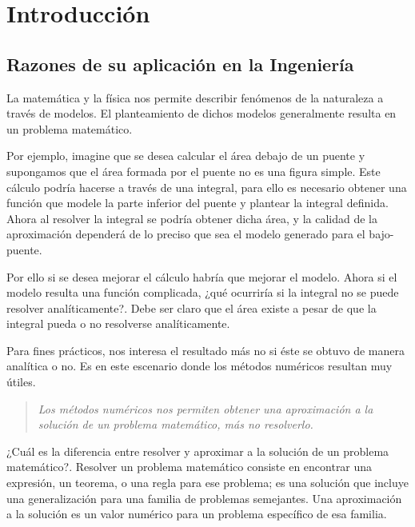 \chapter{Introducción}


\section{Razones de su aplicación en la Ingeniería}
La matemática y la física nos permite describir fenómenos de la naturaleza a través de modelos. El planteamiento de dichos modelos
generalmente resulta en un problema matemático. 

Por ejemplo, imagine que se desea calcular el área debajo de un puente y supongamos que el área formada por el puente no es una figura simple. 
Este cálculo podría hacerse a través de una integral, para ello es necesario obtener una función que modele la parte inferior del puente y plantear
la integral definida. Ahora al resolver la integral se podría obtener dicha área, y la calidad de la aproximación dependerá de lo preciso que sea
el modelo generado para el bajo-puente.

Por ello si se desea mejorar el cálculo habría que mejorar el modelo. Ahora si el modelo resulta una función complicada, ¿qué ocurriría si la integral
no se puede resolver analíticamente?. Debe ser claro que el área existe a pesar de que la integral pueda o no resolverse analíticamente. 

Para fines prácticos, nos interesa el resultado más no si éste se obtuvo de manera analítica o no. Es en este escenario donde los métodos numéricos
resultan muy útiles. 

\begin{verse}
\textit{Los métodos numéricos nos permiten obtener una aproximación a la solución de un problema matemático, más no resolverlo.} 
\end{verse}

¿Cuál es la diferencia entre resolver y aproximar a la solución de un problema matemático?. Resolver un problema matemático consiste en encontrar
una expresión, un teorema, o una regla para ese problema; es una solución que incluye una generalización para una familia de problemas semejantes.
Una aproximación a la solución es un valor numérico para un problema específico de esa familia.


